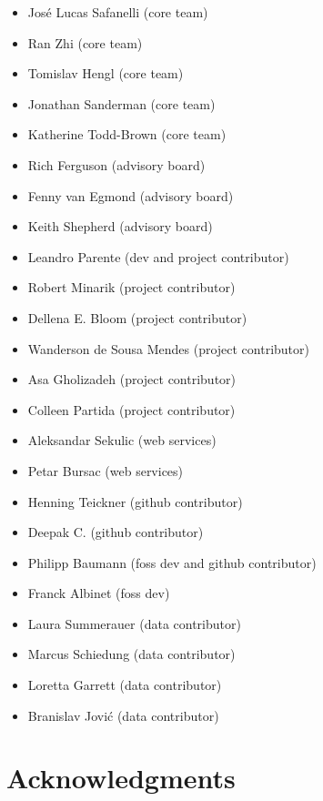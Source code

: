 \documentclass[
  letterpaper,
  DIV=11,
  numbers=noendperiod]{scrreprt}
\providecommand{\tightlist}{%
  \setlength{\itemsep}{0pt}\setlength{\parskip}{0pt}}\usepackage{longtable,booktabs,array}
\begin{document}
\begin{itemize}
\tightlist
\item
  José Lucas Safanelli (core team)
\item
  Ran Zhi (core team)
\item
  Tomislav Hengl (core team)
\item
  Jonathan Sanderman (core team)
\item
  Katherine Todd-Brown (core team)
\item
  Rich Ferguson (advisory board)
\item
  Fenny van Egmond (advisory board)
\item
  Keith Shepherd (advisory board)
\item
  Leandro Parente (dev and project contributor)
\item
  Robert Minarik (project contributor)
\item
  Dellena E. Bloom (project contributor)
\item
  Wanderson de Sousa Mendes (project contributor)
\item
  Asa Gholizadeh (project contributor)
\item
  Colleen Partida (project contributor)
\item
  Aleksandar Sekulic (web services)
\item
  Petar Bursac (web services)
\item
  Henning Teickner (github contributor)
\item
  Deepak C. (github contributor)
\item
  Philipp Baumann (foss dev and github contributor)
\item
  Franck Albinet (foss dev)
\item
  Laura Summerauer (data contributor)
\item
  Marcus Schiedung (data contributor)
\item
  Loretta Garrett (data contributor)
\item
  Branislav Jović (data contributor)
\end{itemize}

\section*{Acknowledgments}\label{acknowledgments}

\end{document}
